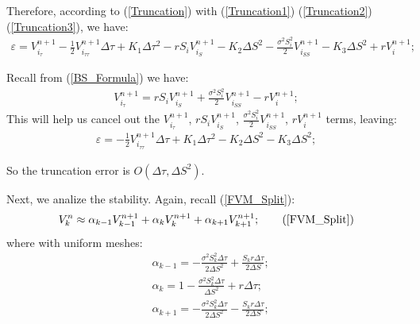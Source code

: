 \documentclass[final]{siamltex}
\begin{document}
Therefore, according to (\ref{Truncation}) with (\ref{Truncation1}) (\ref{Truncation2}) (\ref{Truncation3}), we have:
\begin{equation}
\begin{split}
	\varepsilon = V_{i_\tau}^{n+1}-\frac{1}{2}V_{i_{\tau \tau}}^{n+1}\Delta \tau + K_1 \Delta \tau^2-rS_iV^{n+1}_{i_{S}} - K_2 \Delta S^2
	- \frac{\sigma^2 S_i^2}{2}V^{n+1}_{i_{SS}}-K_3\Delta S^2+ rV_i^{n+1};
\end{split}
\label{TruncationSumUp}
\end{equation}

Recall from (\ref{BS_Formula}) we have:
\begin{equation}
\begin{split}
V_{i_\tau}^{n+1}=rS_iV^{n+1}_{i_{S}} 
+ \frac{\sigma^2 S_i^2}{2}V^{n+1}_{i_{SS}}- rV_i^{n+1};
\end{split}
\label{TruncationCancelOut}
\end{equation}
This will help us cancel out the $V_{i_\tau}^{n+1}$, $rS_iV^{n+1}_{i_{S}} $, 
$ \frac{\sigma^2 S_i^2}{2}V^{n+1}_{i_{SS}}$, $rV_i^{n+1}$ terms, leaving:
\begin{equation}
\begin{split}
\varepsilon = -\frac{1}{2}V_{i_{\tau \tau}}^{n+1}\Delta \tau + K_1 \Delta \tau^2 - K_2 \Delta S^2-K_3\Delta S^2;
\end{split}
\label{TruncationResult}
\end{equation}

So the truncation error is $O(\Delta \tau, \Delta S^2)$.

Next, we analize the stability. Again, recall (\ref{FVM_Split}):
\begin{equation}
V_k^n \approx \alpha _{k-1} V_{k-1}^{n+1} + \alpha _k V_{k}^{n+1} + \alpha _{k+1} V_{k+1}^{n+1};
\tag{\ref{FVM_Split}}
\end{equation}
where with uniform meshes:
\begin{equation}
\begin{split}
& \alpha_{k-1}  =  -\frac {\sigma^2 S_k^2 \Delta \tau}{2\Delta S^2} + \frac{S_k r \Delta \tau} {2\Delta S};\\
& \alpha_{k}  = 1 - \frac {\sigma^2 S_k^2 \Delta \tau}{\Delta S^2} + r \Delta \tau;\\
& \alpha_{k+1}  = -\frac {\sigma^2 S_k^2 \Delta \tau}{2\Delta S^2} - \frac{S_k r \Delta \tau} {2\Delta S};
\end{split}
\end{equation}
\end{document}
